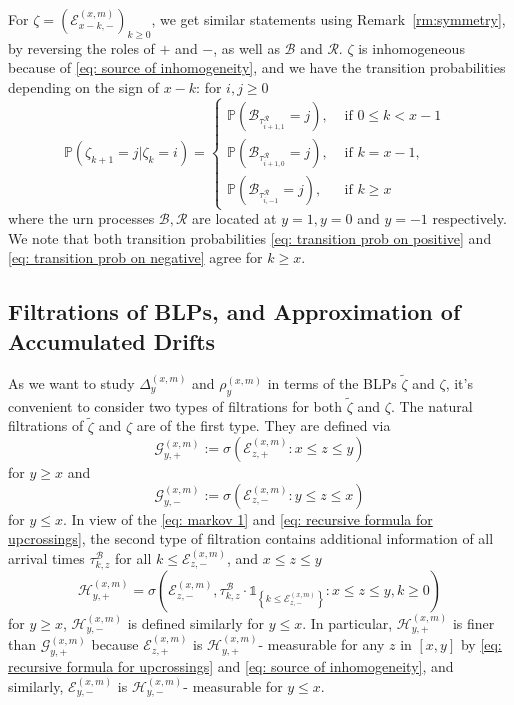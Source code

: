 \documentclass[EJP]{ejpecp} %
\begin{document}
For $\zeta= \left(\mathcal{E}^{(x,m)}_{x-k,-} \right)_{k\geq 0}$, we get similar statements using Remark~\ref{rm:symmetry}, by reversing the roles of $+$ and $-$, as well as $\mathscr{B}$ and $\mathscr{R}$. $\zeta$ is inhomogeneous because of \eqref{eq: source of inhomogeneity}, and we have the transition probabilities depending on the sign of $x-k$: for $i,j\geq 0$
\begin{equation}\label{eq: transition prob on negative}
	\mathbb{P}\left(\zeta_{k+1}=j \vert \zeta_k =i  \right) = 
	\begin{cases}
		\mathbb{P}\left( \mathscr{B}_{\tau_{i+1,1}^{\mathscr{R}}} = j \right) ,& \mbox{ if $0 \leq k <  x-1$ }
		\\
		\mathbb{P}\left( \mathscr{B}_{\tau_{i+1,0}^{\mathscr{R}}} = j \right) ,& \mbox{ if $k =  x-1$, }
		\\
		\mathbb{P}\left( \mathscr{B}_{\tau_{i,-1}^{\mathscr{R}}} = j \right) ,& \mbox{ if $k \geq x$ }
	\end{cases}
\end{equation}
where the urn processes $\mathscr{B}, \mathscr{R}$ are located at $y = 1, y=0$ and $y = -1$ respectively. We note that both transition probabilities \eqref{eq: transition prob on positive} and \eqref{eq: transition prob on negative} agree for $k \ge x$.


\subsection{Filtrations of BLPs, and Approximation of Accumulated Drifts}\label{subsec: measurability}

As we want to study $\Delta^{(x,m)}_{y}$ and $\rho^{(x,m)}_{y}$ in terms of the BLPs $\tilde{\zeta}$ and $\zeta$, it's convenient to consider two types of filtrations for both $\tilde{\zeta}$ and $\zeta$. The natural filtrations of $\tilde{\zeta}$ and $\zeta$ are of the first type. They are defined via 
$$\mathcal{G}_{y, +}^{(x,m)}:=\sigma\left(\mathcal{E}^{(x,m)}_{z, +}: x \le z \le y\right) $$ for $y \ge x$ and $$\mathcal{G}_{y, -}^{(x,m)}:=\sigma\left(\mathcal{E}^{(x,m)}_{z, -}: y \le z \le x\right) $$ for $y \le x$.
In view of the \eqref{eq: markov 1} and \eqref{eq: recursive formula for upcrossings},
the second type of filtration contains additional information of all arrival times $\tau^\mathscr{B}_{k,z}$ for all $k\leq \mathcal{E}^{(x,m)}_{z, -}$, and $x\leq z \leq y$
\[
\mathcal{H}_{y, +}^{(x,m)} = \sigma\left( \mathcal{E}_{z, -}^{(x,m)}, \tau_{k, z}^\mathscr{B}\cdot \mathbb{1}_{\left\{ k\leq \mathcal{E}_{z, -}^{(x,m)} \right\}} : x \leq  z \leq y,  k \geq 0 \right) 
\]
for $y\geq x$, $\mathcal{H}_{y, -}^{(x,m)}$ is defined similarly for $y\leq x$.
In particular, $\mathcal{H}_{y, +}^{(x,m)}$ is finer than $\mathcal{G}_{y, +}^{(x,m)}$ because $\mathcal{E}_{z, +}^{(x,m)}$ is $\mathcal{H}_{y, +}^{(x,m)}$- measurable for any $z$ in $[x,y]$ by \eqref{eq: recursive formula for upcrossings} and \eqref{eq: source of inhomogeneity}, and similarly, $\mathcal{E}_{y, -}^{(x,m)}$ is $\mathcal{H}_{y, -}^{(x,m)}$- measurable for $ y\leq x$. 
\end{document}

